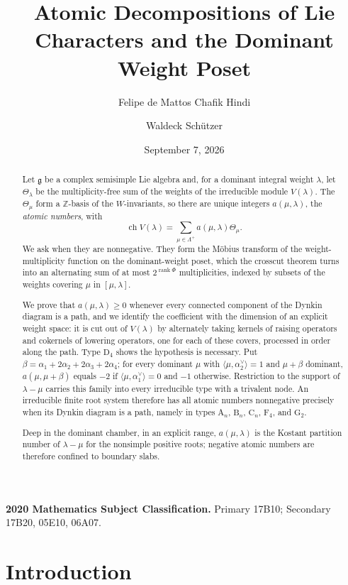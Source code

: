 \documentclass[11pt]{article}
\title{Atomic Decompositions of Lie Characters and the Dominant Weight Poset}
\author{Felipe de Mattos Chafik Hindi \and Waldeck Sch\"utzer}
\date{September 7, 2026}
\theoremstyle{definition}
\theoremstyle{remark}
\newcommand{\Raiz}{\Phi}
\newcommand{\Pesos}{\Lambda}
\newcommand{\Weyl}{W}
\newcommand{\chr}{\operatorname{ch}}
\newcommand{\typeA}{\ensuremath{\mathrm{A}}}
\newcommand{\typeB}{\ensuremath{\mathrm{B}}}
\newcommand{\typeC}{\ensuremath{\mathrm{C}}}
\newcommand{\typeD}{\ensuremath{\mathrm{D}}}
\newcommand{\typeF}{\ensuremath{\mathrm{F}}}
\newcommand{\typeG}{\ensuremath{\mathrm{G}}}
\newcommand{\Z}{\mathbb Z}
\begin{document}
\maketitle

\begin{abstract}
Let $\mathfrak g$ be a complex semisimple Lie algebra and, for a dominant
integral weight $\lambda$, let $\Theta_\lambda$ be the multiplicity-free sum
of the weights of the irreducible module $V(\lambda)$.  The $\Theta_\mu$ form
a $\Z$-basis of the $\Weyl$-invariants, so there are unique integers
$a(\mu,\lambda)$, the \emph{atomic numbers}, with
\[
    \chr V(\lambda)=\sum_{\mu\in\Pesos^+}a(\mu,\lambda)\Theta_\mu .
\]
We ask when they are nonnegative.  They form the M\"obius transform of the
weight-multiplicity function on the dominant-weight poset, which the crosscut
theorem turns into an alternating sum of at most
$2^{\operatorname{rank}\Raiz}$ multiplicities, indexed by subsets of the
weights covering $\mu$ in $[\mu,\lambda]$.

We prove that $a(\mu,\lambda)\ge0$ whenever every connected component of the
Dynkin diagram is a path, and we identify the coefficient with the dimension
of an explicit weight space: it is cut out of $V(\lambda)$ by alternately
taking kernels of raising operators and cokernels of lowering operators, one
for each of these covers, processed in order along the path.  Type
$\typeD_4$ shows the hypothesis is necessary.  Put
$\beta=\alpha_1+2\alpha_2+2\alpha_3+2\alpha_4$; for every dominant $\mu$ with
$\langle\mu,\alpha_2^\vee\rangle=1$ and $\mu+\beta$ dominant,
$a(\mu,\mu+\beta)$ equals $-2$ if $\langle\mu,\alpha_1^\vee\rangle=0$ and
$-1$ otherwise.  Restriction to the support of $\lambda-\mu$ carries this
family into every irreducible type with a trivalent node.  An irreducible
finite root system therefore has all atomic numbers nonnegative precisely
when its Dynkin diagram is a path, namely in types $\typeA_n$, $\typeB_n$,
$\typeC_n$, $\typeF_4$, and $\typeG_2$.

Deep in the dominant chamber, in an explicit range, $a(\mu,\lambda)$ is the
Kostant partition number of $\lambda-\mu$ for the nonsimple positive roots;
negative atomic numbers are therefore confined to boundary slabs.
\end{abstract}

\noindent\textbf{2020 Mathematics Subject Classification.}
Primary 17B10; Secondary 17B20, 05E10, 06A07.

\section{Introduction}
\end{document}
